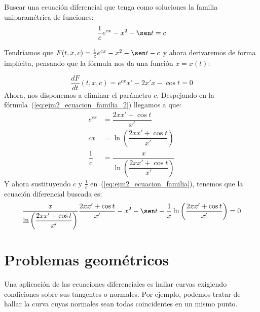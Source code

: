 \begin{ejemplo}
    Buscar una ecuación diferencial que tenga como soluciones la familia uniparamétrica de funciones:
    \begin{equation}\label{eq:ejm2_ecuacion_familia}
        \dfrac{1}{c}e^{cx} - x^2 - \sen t = c
    \end{equation}
% 
% 

    Tendríamos que $F(t,x,c) = \frac{1}{c}e^{cx} - x^2-\sen t - c$ y ahora derivaremos de forma implícita, pensando que la fórmula nos da una función $x=x(t)$:

    \begin{equation}\label{eq:ejm2_ecuacion_familia_2}
        \dfrac{d F}{d t}(t,x,c) = e^{cx}x' - 2x'x - \cos t = 0
    \end{equation}
    Ahora, nos disponemos a eliminar el parámetro $c$. Despejando en la fórmula~(\ref{eq:ejm2_ecuacion_familia_2}) llegamos a que:
    \begin{align*}
        e^{cx} &= \dfrac{2xx' + \cos t}{x'} \\
        cx &= \ln\left(\dfrac{2xx'+\cos t}{x'}\right) \\
        \dfrac{1}{c} &= \dfrac{x}{\ln \left(\dfrac{2xx' + \cos t}{x'}\right)}
    \end{align*}
    Y ahora sustituyendo $c$ y $\frac{1}{c}$ en~(\ref{eq:ejm2_ecuacion_familia}), tenemos que la ecuación diferencial buscada es:
    \begin{equation*}
       \dfrac{x}{\ln \left(\dfrac{2xx' + \cos t}{x'}\right)} \dfrac{2xx' + \cos t}{x'} - x^2-\sen t - \dfrac{1}{x}\ln \left(\dfrac{2xx' + \cos t}{x'}\right) = 0
    \end{equation*}
\end{ejemplo}

\section{Problemas geométricos}
Una aplicación de las ecuaciones diferenciales es hallar curvas exigiendo condiciones sobre sus tangentes o normales. Por ejemplo, podemos tratar de hallar la curva cuyas normales sean todas coincidentes en un mismo punto.

